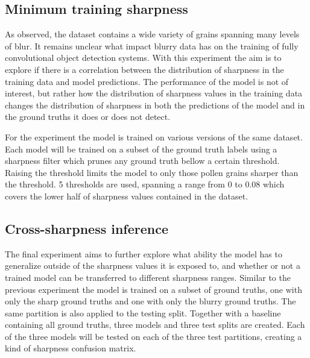 \subsection{Minimum training sharpness}
As observed, the dataset contains a wide variety of grains spanning many levels of blur.
It remains unclear what impact blurry data has on the training of fully convolutional object detection systems.
With this experiment the aim is to explore if there is a correlation between the distribution of sharpness in the training data and model predictions.
The performance of the model is not of interest, but rather how the distribution of sharpness values in the training data changes the distribution of sharpness in both the predictions of the model and in the ground truths it does or does not detect.

For the experiment the model is trained on various versions of the same dataset.
Each model will be trained on a subset of the ground truth labels using a sharpness filter which prunes any ground truth bellow a certain threshold.
Raising the threshold limits the model to only those pollen grains sharper than the threshold.
5 thresholds are used, spanning a range from 0 to 0.08 which covers the lower half of sharpness values contained in the dataset.

\subsection{Cross-sharpness inference}
The final experiment aims to further explore what ability the model has to generalize outside of the sharpness values it is exposed to, and whether or not a trained model can be transferred to different sharpness ranges.
Similar to the previous experiment the model is trained on a subset of ground truths, one with only the sharp ground truths and one with only the blurry ground truths.
The same partition is also applied to the testing split.
Together with a baseline containing all ground truths, three models and three test splits are created.
Each of the three models will be tested on each of the three test partitions, creating a kind of sharpness confusion matrix.

